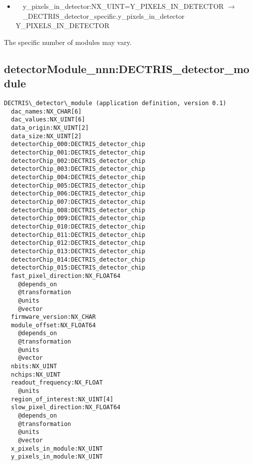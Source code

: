 \documentclass[11pt]{article}
\begin{document}
{{\begin{itemize}
\item{\verb|  |y\_pixels\_in\_detector:NX\_UINT=Y\_PIXELS\_IN\_DETECTOR $\rightarrow$\\
\verb|  |\_DECTRIS\_detector\_specific.y\_pixels\_in\_detector Y\_PIXELS\_IN\_DETECTOR}
\end{itemize}

The specific number of modules may vary.

\subsection{detectorModule\_nnn:DECTRIS\_detector\_module}

\begin{verbatim}
DECTRIS\_detector\_module (application definition, version 0.1)
  dac_names:NX_CHAR[6]
  dac_values:NX_UINT[6]
  data_origin:NX_UINT[2]
  data_size:NX_UINT[2]
  detectorChip_000:DECTRIS_detector_chip
  detectorChip_001:DECTRIS_detector_chip
  detectorChip_002:DECTRIS_detector_chip
  detectorChip_003:DECTRIS_detector_chip
  detectorChip_004:DECTRIS_detector_chip
  detectorChip_005:DECTRIS_detector_chip
  detectorChip_006:DECTRIS_detector_chip
  detectorChip_007:DECTRIS_detector_chip
  detectorChip_008:DECTRIS_detector_chip
  detectorChip_009:DECTRIS_detector_chip
  detectorChip_010:DECTRIS_detector_chip
  detectorChip_011:DECTRIS_detector_chip
  detectorChip_012:DECTRIS_detector_chip
  detectorChip_013:DECTRIS_detector_chip
  detectorChip_014:DECTRIS_detector_chip
  detectorChip_015:DECTRIS_detector_chip
  fast_pixel_direction:NX_FLOAT64
    @depends_on
    @transformation
    @units
    @vector
  firmware_version:NX_CHAR
  module_offset:NX_FLOAT64
    @depends_on
    @transformation
    @units
    @vector
  nbits:NX_UINT
  nchips:NX_UINT
  readout_frequency:NX_FLOAT
    @units
  region_of_interest:NX_UINT[4]
  slow_pixel_direction:NX_FLOAT64
    @depends_on
    @transformation
    @units
    @vector
  x_pixels_in_module:NX_UINT
  y_pixels_in_module:NX_UINT
\end{verbatim}

\begin{itemize}


\end{itemize}}}
\end{document}

